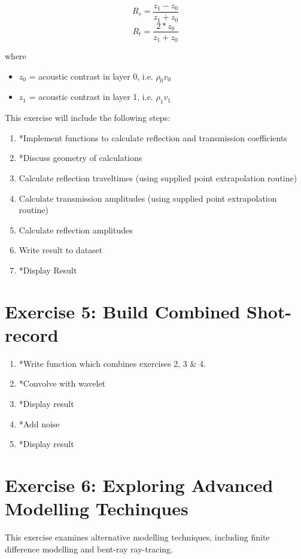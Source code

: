 \documentclass[a4paper, 10pt]{article}
\begin{document}
\[ R_r = \frac{z_1 - z_0}{z_1+z_0}\]
\[ R_t = \frac{2*z_0}{z_1+z_0}\]

where 
\begin{itemize}
\item $z_0$  = acoustic contrast in layer 0, i.e. $\rho_0 v_0$
\item $z_1$ = acoustic contrast in layer 1, i.e. $\rho_1 v_1$
\end{itemize}

This exercise will include the following steps:


\begin{enumerate}
\item *Implement functions to calculate reflection and transmission coefficients
\item *Discuss geometry of calculations
\item Calculate reflection traveltimes (using supplied point extrapolation routine)
\item Calculate transmission amplitudes (using supplied point extrapolation routine)
\item Calculate reflection amplitudes
\item Write result to dataset
\item *Display Result
\end{enumerate}


\section*{Exercise 5: Build Combined Shot-record}

\begin{enumerate}
\item *Write function which combines exercises 2, 3 \& 4.
\item *Convolve with wavelet
\item *Display result
\item *Add noise
\item *Display result
\end{enumerate}
\section*{Exercise 6: Exploring Advanced Modelling Techinques}

This exercise examines alternative modelling techniques, including finite difference modelling and bent-ray ray-tracing.

%
%
%
%
%
%
\end{document}
